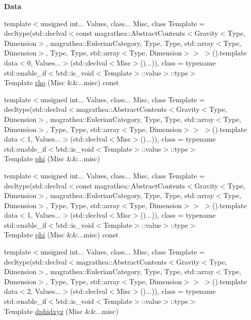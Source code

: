 \begin{Indent}{\bf Data}
\begin{DoxyCompactItemize}
\item 
{\footnotesize template$<$unsigned int... Values, class... Misc, class Template  = decltype(std\-::declval$<$const magrathea\-::\-Abstract\-Contents$<$\-Gravity$<$\-Type, Dimension$>$, magrathea\-::\-Eulerian\-Category, Type, Type, std\-::array$<$\-Type, Dimension$>$, Type, Type, std\-::array$<$\-Type, Dimension$>$$>$ $>$().\-template data$<$0, Values...$>$(std\-::declval$<$\-Misc$>$()...)), class  = typename std\-::enable\-\_\-if$<$!std\-::is\-\_\-void$<$\-Template$>$\-::value$>$\-::type$>$ }\\Template \hyperlink{exceptionGravity_a1c46caab7acffb6df96b7c1dcc2973b2}{rho} (Misc \&\&...misc) const 
\item 
{\footnotesize template$<$unsigned int... Values, class... Misc, class Template  = decltype(std\-::declval$<$magrathea\-::\-Abstract\-Contents$<$\-Gravity$<$\-Type, Dimension$>$, magrathea\-::\-Eulerian\-Category, Type, Type, std\-::array$<$\-Type, Dimension$>$, Type, Type, std\-::array$<$\-Type, Dimension$>$$>$ $>$().\-template data$<$1, Values...$>$(std\-::declval$<$\-Misc$>$()...)), class  = typename std\-::enable\-\_\-if$<$!std\-::is\-\_\-void$<$\-Template$>$\-::value$>$\-::type$>$ }\\Template \hyperlink{exceptionGravity_adb0a25af2a240305c212eca3b0e6efac}{phi} (Misc \&\&...misc)
\item 
{\footnotesize template$<$unsigned int... Values, class... Misc, class Template  = decltype(std\-::declval$<$const magrathea\-::\-Abstract\-Contents$<$\-Gravity$<$\-Type, Dimension$>$, magrathea\-::\-Eulerian\-Category, Type, Type, std\-::array$<$\-Type, Dimension$>$, Type, Type, std\-::array$<$\-Type, Dimension$>$$>$ $>$().\-template data$<$1, Values...$>$(std\-::declval$<$\-Misc$>$()...)), class  = typename std\-::enable\-\_\-if$<$!std\-::is\-\_\-void$<$\-Template$>$\-::value$>$\-::type$>$ }\\Template \hyperlink{exceptionGravity_a7d1bd776916ad1a88a0e2470d0e5b5e2}{phi} (Misc \&\&...misc) const 
\item 
{\footnotesize template$<$unsigned int... Values, class... Misc, class Template  = decltype(std\-::declval$<$magrathea\-::\-Abstract\-Contents$<$\-Gravity$<$\-Type, Dimension$>$, magrathea\-::\-Eulerian\-Category, Type, Type, std\-::array$<$\-Type, Dimension$>$, Type, Type, std\-::array$<$\-Type, Dimension$>$$>$ $>$().\-template data$<$2, Values...$>$(std\-::declval$<$\-Misc$>$()...)), class  = typename std\-::enable\-\_\-if$<$!std\-::is\-\_\-void$<$\-Template$>$\-::value$>$\-::type$>$ }\\Template \hyperlink{exceptionGravity_a28b74bae68bdd45514753c8b3779f90c}{dphidxyz} (Misc \&\&...misc)

\end{DoxyCompactItemize}
\end{Indent}
